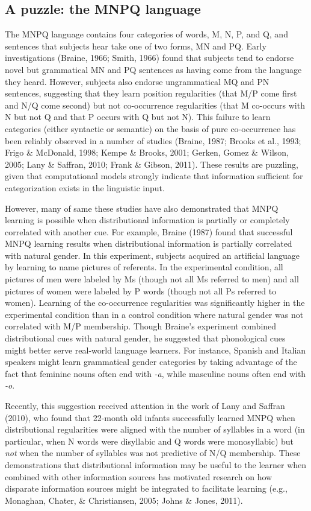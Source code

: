 \documentclass[man,floatsintext]{apa6}
\begin{document}
\subsection{A puzzle: the MNPQ language}

The MNPQ language contains four categories of words, M, N, P, and Q, and sentences that subjects hear take one of two forms, MN and PQ. Early investigations (Braine, 1966; Smith, 1966) found that subjects tend to endorse novel but grammatical MN and PQ sentences as having come from the language they heard. However, subjects also endorse ungrammatical MQ and PN sentences, suggesting that they learn position regularities (that M/P come first and N/Q come second) but not co-occurrence regularities (that M co-occurs with N but not Q and that P occurs with Q but not N). This failure to learn categories (either syntactic or semantic) on the basis of pure co-occurrence has been reliably observed in a number of studies (Braine, 1987; Brooks et al., 1993; Frigo \& McDonald, 1998; Kempe \& Brooks, 2001; Gerken, Gomez \& Wilson, 2005; Lany \& Saffran, 2010; Frank \& Gibson, 2011). These results are puzzling, given that computational models strongly indicate that information sufficient for categorization exists in the linguistic input.

However, many of same these studies have also demonstrated that MNPQ learning is possible when distributional information is partially or completely correlated with another cue. For example, Braine (1987) found that successful MNPQ learning results when distributional information is partially correlated with natural gender. In this experiment, subjects acquired an artificial language by learning to name pictures of referents. In the experimental condition, all pictures of men were labeled by Ms (though not all Ms referred to men) and all pictures of women were labeled by P words (though not all Ps referred to women). Learning of the co-occurrence regularities was significantly higher in the experimental condition than in a control condition where natural gender was not correlated with M/P membership. Though Braine's experiment combined distributional cues with natural gender, he suggested that phonological cues might better serve real-world language learners. For instance, Spanish and Italian speakers might learn grammatical gender categories by taking advantage of the fact that feminine nouns often end with \emph{-a}, while masculine nouns often end with \emph{-o}.

Recently, this suggestion received attention in the work of Lany and Saffran (2010), who found that 22-month old infants successfully learned MNPQ when distributional regularities were aligned with the number of syllables in a word (in particular, when N words were disyllabic and Q words were monosyllabic) but \emph{not} when the number of syllables was not predictive of N/Q membership. These demonstrations that distributional information may be useful to the learner when combined with other information sources has motivated research on how disparate information sources might be integrated to facilitate learning (e.g., Monaghan, Chater, \& Christiansen, 2005; Johns \& Jones, 2011).
\end{document}
